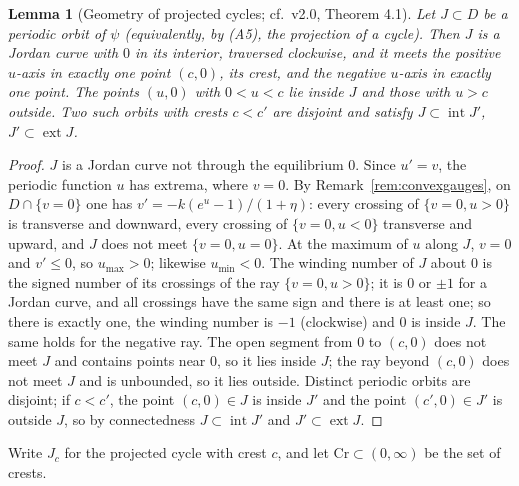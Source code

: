 \documentclass[11pt,a4paper]{article}
\numberwithin{equation}{section}
\newtheorem{lemma}[theorem]{Lemma}
\theoremstyle{remark}\newtheorem{remark}[theorem]{Remark}
\begin{document}
\begin{lemma}[Geometry of projected cycles; cf.\ v2.0, Theorem 4.1]\label{lem:cyclegeom}
Let $J\subset D$ be a periodic orbit of $\psi$ (equivalently, by (A5), the projection of a cycle). Then $J$ is a
Jordan curve with $0$ in its interior, traversed clockwise, and it meets the positive $u$-axis in exactly one point
$(c,0)$, its \emph{crest}, and the negative $u$-axis in exactly one point. The points $(u,0)$ with $0<u<c$ lie inside
$J$ and those with $u>c$ outside. Two such orbits with crests $c<c'$ are disjoint and satisfy
$J\subset\operatorname{int}J'$, $J'\subset\operatorname{ext}J$.
\end{lemma}
\begin{proof}
$J$ is a Jordan curve not through the equilibrium $0$. Since $u'=v$, the periodic function $u$ has extrema, where
$v=0$. By Remark~\ref{rem:convexgauges}, on $D\cap\{v=0\}$ one has $v'=-k(e^{u}-1)/(1+\eta)$: every crossing of
$\{v=0,u>0\}$ is transverse and downward, every crossing of $\{v=0,u<0\}$ transverse and upward, and $J$ does not
meet $\{v=0,u=0\}$. At the maximum of $u$ along $J$, $v=0$ and $v'\le0$, so $u_{\max}>0$; likewise $u_{\min}<0$. The
winding number of $J$ about $0$ is the signed number of its crossings of the ray $\{v=0,u>0\}$; it is $0$ or $\pm1$
for a Jordan curve, and all crossings have the same sign and there is at least one; so there is exactly one, the
winding number is $-1$ (clockwise) and $0$ is inside $J$. The same holds for the negative ray. The open segment from
$0$ to $(c,0)$ does not meet $J$ and contains points near $0$, so it lies inside $J$; the ray beyond $(c,0)$ does not
meet $J$ and is unbounded, so it lies outside. Distinct periodic orbits are disjoint; if $c<c'$, the point $(c,0)\in J$
is inside $J'$ and the point $(c',0)\in J'$ is outside $J$, so by connectedness $J\subset\operatorname{int}J'$ and
$J'\subset\operatorname{ext}J$.
\end{proof}
Write $J_c$ for the projected cycle with crest $c$, and let $\mathrm{Cr}\subset(0,\infty)$ be the set of crests.
\end{document}
